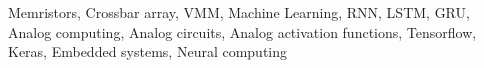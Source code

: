 \begin{keywords}
  Memristors, Crossbar array, VMM, Machine Learning, RNN, LSTM, GRU, Analog computing, Analog circuits, Analog activation functions, Tensorflow, Keras, Embedded systems, Neural computing
\end{keywords}
\clearpage
\thispagestyle{empty}
\cleardoublepage
